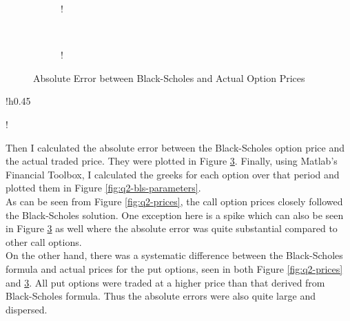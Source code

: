 \documentclass[11pt, fleqn]{article}
\begin{document}
\begin{figure}[!h]
   \centering 
   \begin{subfigure}[b]{0.45\textwidth}
     	\resizebox {\textwidth} {!} { }
		\label{fig:q2-error}
    \end{subfigure}
    ~
    \begin{subfigure}[b]{0.45\textwidth}
       	\resizebox {\textwidth} {!} { }
        \label{fig:q2-error-boxplot}
    \end{subfigure}
	\vspace{-0.5cm}
    \caption{Absolute Error between Black-Scholes and Actual Option Prices}
	\label{fig:q2-error-both}
\end{figure}

\begin{wrapfigure}{!h}{0.45\textwidth}
\vspace{-1.5cm}
\begin{center}
	\resizebox {0.4\textwidth} {!} { }
	\caption{Black-Scholes Parameters}
	\label{fig:q2-bls-parameters}
	\vspace{-1cm}
\end{center}
\end{wrapfigure}

Then I calculated the absolute error between the Black-Scholes option price and the actual traded price. They were plotted in Figure \ref{fig:q2-error-both}. Finally, using Matlab's Financial Toolbox, I calculated the greeks for each option over that period and plotted them in Figure \ref{fig:q2-bls-parameters}.\\

As can be seen from Figure \ref{fig:q2-prices}, the call option prices closely followed the Black-Scholes solution. One exception here is a spike which can also be seen in Figure \ref{fig:q2-error-both} as well where the absolute error was quite substantial compared to other call options.\\

On the other hand, there was a systematic difference between the Black-Scholes formula and actual prices for the put options, seen in both Figure \ref{fig:q2-prices} and \ref{fig:q2-error-both}. All put options were traded at a higher price than that derived from Black-Scholes formula. Thus the absolute errors were also quite large and dispersed.\\
\end{document}

